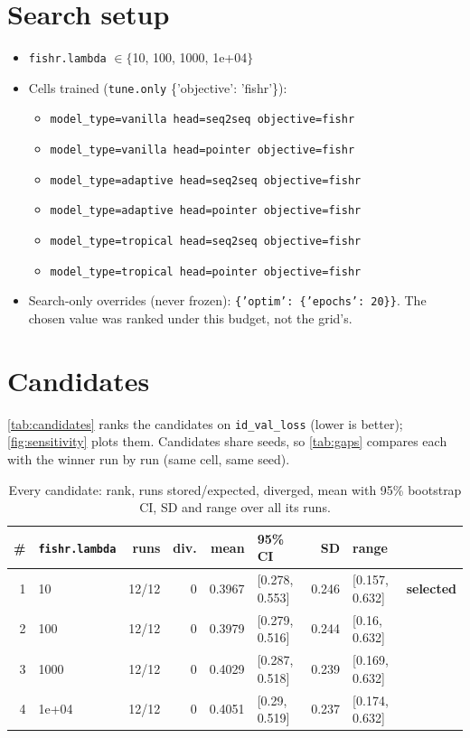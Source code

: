 \documentclass[10pt]{article}
\begin{document}
\section{Search setup}
\begin{itemize}\setlength\itemsep{0pt}
\item \texttt{fishr.lambda} $\in \{$10, 100, 1000, 1e+04$\}$
\item Cells trained (\texttt{tune.only} \{'objective': 'fishr'\}):
\begin{itemize}\setlength\itemsep{0pt}
\item \texttt{model\_type=vanilla head=seq2seq objective=fishr}
\item \texttt{model\_type=vanilla head=pointer objective=fishr}
\item \texttt{model\_type=adaptive head=seq2seq objective=fishr}
\item \texttt{model\_type=adaptive head=pointer objective=fishr}
\item \texttt{model\_type=tropical head=seq2seq objective=fishr}
\item \texttt{model\_type=tropical head=pointer objective=fishr}
\end{itemize}
\item Search-only overrides (never frozen): \texttt{\{'optim': \{'epochs': 20\}\}}. The chosen value was ranked under this budget, not the grid's.
\end{itemize}

\section{Candidates}
\autoref{tab:candidates} ranks the candidates on \texttt{id\_val\_loss} (lower is better); \autoref{fig:sensitivity} plots them.
Candidates share seeds, so \autoref{tab:gaps} compares each with the winner run by run (same cell, same seed).

{\small
\begin{longtable}{rlrrrlrll}
\caption{Every candidate: rank, runs stored/expected, diverged, mean with 95\% bootstrap CI, SD and range over all its runs.}\label{tab:candidates}\\
\toprule
\# & \texttt{fishr.lambda} & runs & div. & mean & 95\% CI & SD & range & \\
\midrule
\endhead
1 & 10 & 12/12 & 0 & 0.3967 & [0.278, 0.553] & 0.246 & [0.157, 0.632] & \textbf{selected}\\
2 & 100 & 12/12 & 0 & 0.3979 & [0.279, 0.516] & 0.244 & [0.16, 0.632] & \\
3 & 1000 & 12/12 & 0 & 0.4029 & [0.287, 0.518] & 0.239 & [0.169, 0.632] & \\
4 & 1e+04 & 12/12 & 0 & 0.4051 & [0.29, 0.519] & 0.237 & [0.174, 0.632] & \\
\bottomrule
\end{longtable}
}
\end{document}
